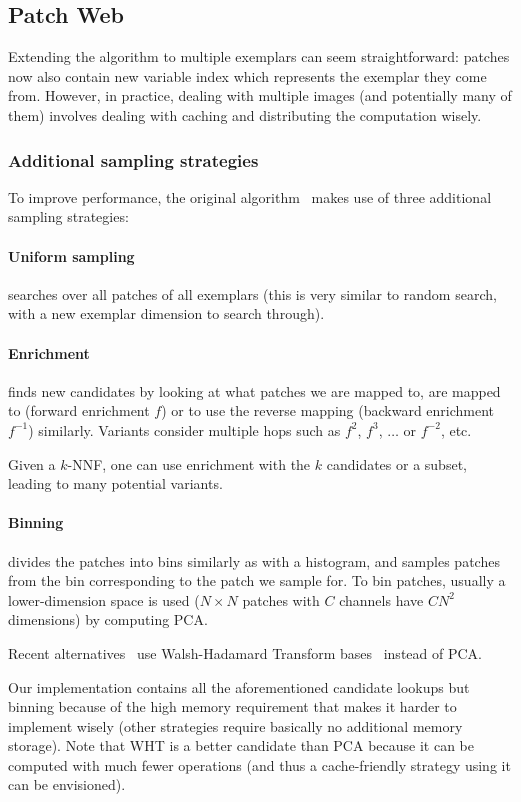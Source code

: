 
\subsection{Patch Web}
Extending the algorithm to multiple exemplars can seem straightforward: patches now also contain new variable index which represents the exemplar they come from.
However, in practice, dealing with multiple images (and potentially many of them) involves dealing with caching and distributing the computation wisely.

\subsubsection{Additional sampling strategies}
To improve performance, the original algorithm~\cite{Barnes11} makes use of three additional sampling strategies:

\paragraph{Uniform sampling} searches over all patches of all exemplars (this is very similar to random search, with a new exemplar dimension to search through).

\paragraph{Enrichment} finds new candidates by looking at what patches we are mapped to, are mapped to (forward enrichment $f$) or to use the reverse mapping (backward enrichment $f^{-1}$) similarly.
Variants consider multiple hops such as $f^2$, $f^3$, $\dots$ or $f^{-2}$, etc.

Given a $k$-NNF, one can use enrichment with the $k$ candidates or a subset, leading to many potential variants.

\paragraph{Binning} divides the patches into bins similarly as with a histogram, and samples patches from the bin corresponding to the patch we sample for.
To bin patches, usually a lower-dimension space is used ($N\times N$ patches with $C$ channels have $CN^2$ dimensions) by computing PCA.

Recent alternatives~\cite{He12} use Walsh-Hadamard Transform bases~\cite{Hel05} instead of PCA.

Our implementation contains all the aforementioned candidate lookups but binning because of the high memory requirement that makes it harder to implement wisely (other strategies require basically no additional memory storage).
Note that WHT is a better candidate than PCA because it can be computed with much fewer operations (and thus a cache-friendly strategy using it can be envisioned).


